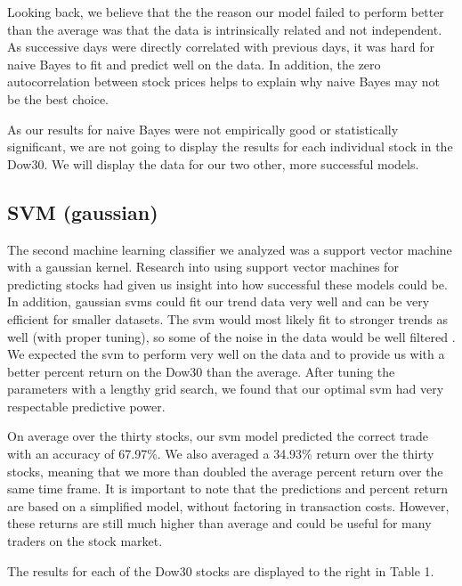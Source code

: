 \documentclass{article}
\begin{document}
Looking back, we believe that the the reason our model failed to perform better than the average was that the data is intrinsically related and not independent. As successive days were directly correlated with previous days, it was hard for naive Bayes to fit and predict well on the data. In addition, the zero autocorrelation between stock prices helps to explain why naive Bayes may not be the best choice. \cite{zhang}

As our results for naive Bayes were not empirically good or statistically significant, we are not going to display the results for each individual stock in the Dow30. We will display the data for our two other, more successful models.

\subsection{SVM (gaussian)}
The second machine learning classifier we analyzed was a support vector machine with a gaussian kernel. Research into using support vector machines for predicting stocks had given us insight into how successful these models could be. In addition, gaussian svms could fit our trend data very well and can be very efficient for smaller datasets. The svm would most likely fit to stronger trends as well (with proper tuning), so some of the noise in the data would be well filtered \cite{daishah}. We expected the svm to perform very well on the data and to provide us with a better percent return on the Dow30 than the average. After tuning the parameters with a lengthy grid search, we found that our optimal svm had very respectable predictive power.

On average over the thirty stocks, our svm model predicted the correct trade with an accuracy of 67.97\%. We also averaged a 34.93\% return over the thirty stocks, meaning that we more than doubled the average percent return over the same time frame. It is important to note that the predictions and percent return are based on a simplified model, without factoring in transaction costs. However, these returns are still much higher than average and could be useful for many traders on the stock market.

The results for each of the Dow30 stocks are displayed to the right in Table 1.
\end{document}

